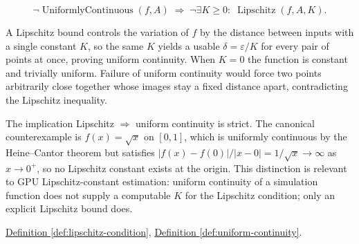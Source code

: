 \begin{remark*}
\[
\neg\operatorname{UniformlyContinuous}(f,A)
\;\Longrightarrow\;
\neg\exists K\ge 0:\;\operatorname{Lipschitz}(f,A,K).
\]
\end{remark*}

\begin{remark*}[Interpretation]
A Lipschitz bound controls the variation of $f$ by the distance between inputs with a single constant $K$, so the same $K$ yields a usable $\delta = \varepsilon/K$ for every pair of points at once, proving uniform continuity. When $K=0$ the function is constant and trivially uniform. Failure of uniform continuity would force two points arbitrarily close together whose images stay a fixed distance apart, contradicting the Lipschitz inequality.
\end{remark*}

\begin{remark*}
The implication Lipschitz $\Rightarrow$ uniform continuity is strict. The canonical counterexample is $f(x)=\sqrt{x}$ on $[0,1]$, which is uniformly continuous by the Heine--Cantor theorem but satisfies $|f(x)-f(0)|/|x-0| = 1/\sqrt{x} \to \infty$ as $x \to 0^+$, so no Lipschitz constant exists at the origin. This distinction is relevant to GPU Lipschitz-constant estimation: uniform continuity of a simulation function does not supply a computable $K$ for the Lipschitz condition; only an explicit Lipschitz bound does.
\end{remark*}

\begin{dependencies}
\hyperref[def:lipschitz-condition]{Definition \ref*{def:lipschitz-condition}}, \hyperref[def:uniform-continuity]{Definition \ref*{def:uniform-continuity}}.
\end{dependencies}


